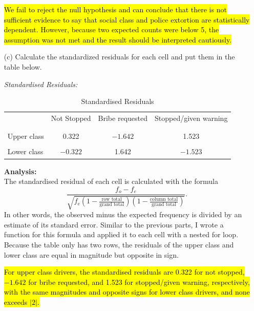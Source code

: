 \documentclass[12pt,letterpaper]{article}
\begin{document}
\begin{enumerate}
	\hl{We fail to reject the null hypothesis and can conclude that there is not sufficient evidence to say that social class and police extortion are statistically dependent. However, because two expected counts were below 5, the assumption was not met and the result should be interpreted cautiously.}
	
	\vspace{.5cm}
	
	\item [(c)] Calculate the standardized residuals for each cell and put them in the table below.
	
	\textit{Standardised Residuals:}
	
	
	\begin{table}[H]
		\centering
		\caption{\footnotesize Standardised Residuals}
		\begin{tabular}{l | c c c }
			& Not Stopped & Bribe requested & Stopped/given warning \\
			\\[-1.8ex] 
			\hline \\[-1.8ex]
			Upper class  & 0.322 & $-1.642$ & 1.523 \\
			\\
			Lower class & $-0.322$ & 1.642 & $-1.523$ \\
			\hline
		\end{tabular}
	\end{table}
	
	\textbf{Analysis:}\\ 
	
	The standardised residual of each cell is calculated with the formula
	\[
	\frac{f_o - f_e}{\sqrt{f_e\left(1-\frac{\text{row total}}{\text{grand total}}\right)\left(1-\frac{\text{column total}}{\text{grand total}}\right)}}.
	\]
	In other words, the observed minus the expected frequency is divided by an estimate of its standard error. Similar to the previous parts, I wrote a function for this formula and applied it to each cell with a nested for loop. Because the table only has two rows, the residuals of the upper class and lower class are equal in magnitude but opposite in sign.
	
\hl{For upper class drivers, the standardised residuals are 0.322 for not stopped, {$-1.642$} for bribe requested, and 1.523 for stopped/given warning, respectively, with the same magnitudes and opposite signs for lower class drivers, and none exceeds {$|2|$}.}
	
	\vspace{.5cm}
	

\end{enumerate}
\end{document}
